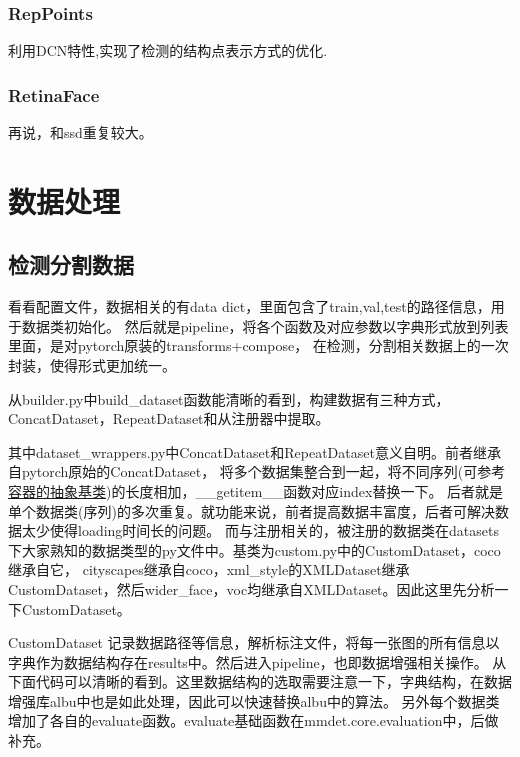 \documentclass[UTF8]{ctexart}
\begin{document}
\subsubsection{RepPoints}
	利用DCN特性,实现了检测的结构点表示方式的优化.

\subsubsection{RetinaFace}
再说，和ssd重复较大。

\section{数据处理}
\label{sec:detail}
\subsection{检测分割数据}
看看配置文件，数据相关的有data dict，里面包含了train,val,test的路径信息，用于数据类初始化。
然后就是pipeline，将各个函数及对应参数以字典形式放到列表里面，是对pytorch原装的transforms+compose，
在检测，分割相关数据上的一次封装，使得形式更加统一。

从builder.py中build\_dataset函数能清晰的看到，构建数据有三种方式，ConcatDataset，RepeatDataset和从注册器中提取。

其中dataset\_wrappers.py中ConcatDataset和RepeatDataset意义自明。前者继承自pytorch原始的ConcatDataset，
将多个数据集整合到一起，将不同序列(可参考\href{https://docs.python.org/zh-cn/3/library/collections.abc.html}
{容器的抽象基类})的长度相加，\_\_getitem\_\_函数对应index替换一下。
后者就是单个数据类(序列)的多次重复。就功能来说，前者提高数据丰富度，后者可解决数据太少使得loading时间长的问题。
而与注册相关的，被注册的数据类在datasets下大家熟知的数据类型的py文件中。基类为custom.py中的CustomDataset，coco继承自它，
cityscapes继承自coco，xml\_style的XMLDataset继承CustomDataset，然后wider\_face，voc均继承自XMLDataset。因此这里先分析一下CustomDataset。


CustomDataset 记录数据路径等信息，解析标注文件，将每一张图的所有信息以字典作为数据结构存在results中。然后进入pipeline，也即数据增强相关操作。
从下面代码可以清晰的看到。这里数据结构的选取需要注意一下，字典结构，在数据增强库albu中也是如此处理，因此可以快速替换albu中的算法。
另外每个数据类增加了各自的evaluate函数。evaluate基础函数在mmdet.core.evaluation中，后做补充。
\end{document}
